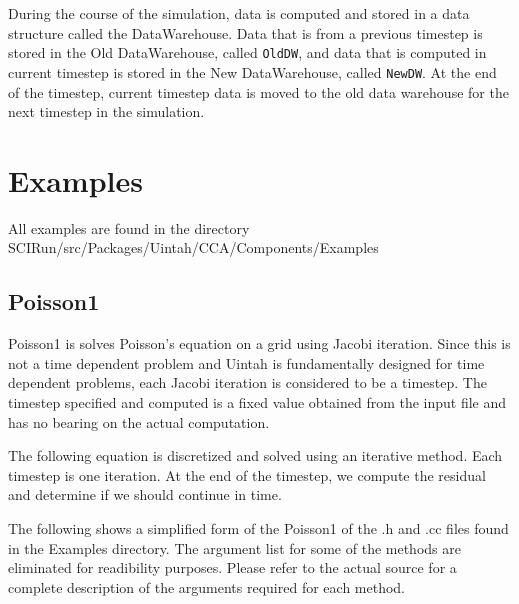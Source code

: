 \documentclass[12pt]{report}
\begin{document}
During the course of the simulation, data is computed and stored in a
data structure called the DataWarehouse.  Data that is from a previous
timestep is stored in the Old DataWarehouse, called \texttt{OldDW},
and data that is computed in current timestep is stored in the New
DataWarehouse, called \texttt{NewDW}.  At the end of the timestep,
current timestep data is moved to the old data warehouse for the next
timestep in the simulation.

\chapter{Examples}


All examples are found in the directory SCIRun/src/Packages/Uintah/CCA/Components/Examples

\section{Poisson1}

Poisson1 is solves Poisson's equation on a grid using Jacobi
iteration.  Since this is not a time dependent problem and Uintah is
fundamentally designed for time dependent problems, each Jacobi
iteration is considered to be a timestep.  The timestep specified and
computed is a fixed value obtained from the input file and has no
bearing on the actual computation.

The following equation is discretized and solved using an iterative
method. Each timestep is one iteration. At the end of the timestep, we
compute the residual and determine if we should continue in time.

The following shows a simplified form of the Poisson1 of the .h and
.cc files found in the Examples directory.  The argument list for some
of the methods are eliminated for readibility purposes.  Please refer
to the actual source for a complete description of the arguments
required for each method.
\end{document}

